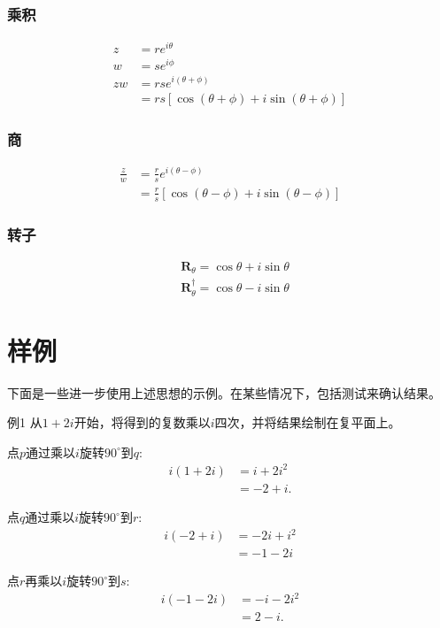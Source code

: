 \subsubsection*{乘积}
$$
\begin{aligned}
z & =r e^{i \theta} \\
w & =s e^{i \phi} \\
z w & =r s e^{i(\theta+\phi)} \\
& =r s[\cos (\theta+\phi)+i \sin (\theta+\phi)]
\end{aligned}
$$

\subsubsection*{商}
$$
\begin{aligned}
\frac{z}{w} & =\frac{r}{s} e^{i(\theta-\phi)} \\
& =\frac{r}{s}[\cos (\theta-\phi)+i \sin (\theta-\phi)]
\end{aligned}
$$

\subsubsection*{转子}
$$
\begin{aligned}
& \mathbf{R}_{\theta}=\cos \theta+i \sin \theta \\
& \mathbf{R}_{\theta}^{\dagger}=\cos \theta-i \sin \theta
\end{aligned}
$$

\section{样例}
下面是一些进一步使用上述思想的示例。在某些情况下，包括测试来确认结果。

例1 从$1+2 i$开始，将得到的复数乘以$i$四次，并将结果绘制在复平面上。

点$p$通过乘以$i$旋转$90^{\circ}$到$q$:
$$
\begin{aligned}
i(1+2 i) & =i+2 i^{2} \\
& =-2+i .
\end{aligned}
$$

点$q$通过乘以$i$旋转$90^{\circ}$到$r$:
$$
\begin{aligned}
i(-2+i) & =-2 i+i^{2} \\
& =-1-2 i
\end{aligned}
$$

点$r$再乘以$i$旋转$90^{\circ}$到$s$:
$$
\begin{aligned}
i(-1-2 i) & =-i-2 i^{2} \\
& =2-i .
\end{aligned}
$$

